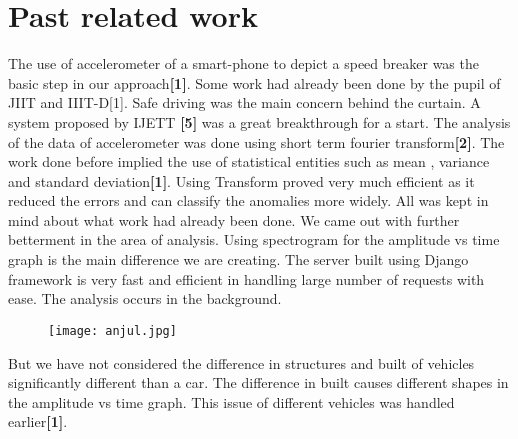 \documentclass[12pt,twocolumn]{article}
\begin{document}
\section{Past related work}
The use of accelerometer of a smart-phone to depict a speed breaker was the basic step in our approach\textbf{[1]}. Some work had already been done by the pupil of JIIT and IIIT-D[1].
Safe driving was the main concern behind the curtain. A system proposed by IJETT \textbf{[5]} was a great breakthrough for a start.
The analysis of the data of accelerometer was done using short term fourier transform\textbf{[2]}. The work done before implied the use of statistical entities such as mean , variance and standard deviation\textbf{[1]}. Using Transform proved very much efficient as it reduced the errors and can classify the anomalies more widely.
All was kept in mind about what work had already been done. We came out with further betterment in the area of analysis. Using spectrogram for the amplitude vs time graph is the main difference we are creating. 
The server built using Django framework is very fast and efficient in handling large number of requests with ease. The analysis occurs in the background.
\begin{figure}[ht!]
\centering
\texttt{[image: anjul.jpg]}
\end{figure}
\newpage 
But we have not considered the difference in structures and built of vehicles significantly different than a car. The difference in built causes different shapes in the amplitude vs time graph. This issue of different vehicles was handled earlier\textbf{[1]}.\\
\end{document}
